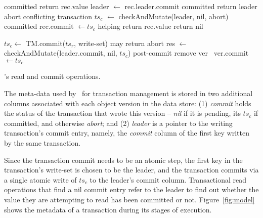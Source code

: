 \begin{algorithm}[t]
  \begin{algorithmic}
    \begin{small}
		 \Comment committed
     			   \State return rec.value \EndIf
      			\State leader $\leftarrow$ rec.leader.commit
      			  \Comment committed
     				   \State return leader \EndIf
			\Else \Comment abort conflicting transaction
				\State $ts_c$ $\leftarrow$ checkAndMutate(leader, nil, abort)
      				 \Comment  committed
     					 \State rec.commit $\leftarrow ts_c$ \Comment helping 
      				  	  return rec.value \EndIf
				\EndIf
			\EndIf
		\EndIf
      \EndFor
      \State  return nil
      \EndProcedure

\Statex

      
      	\State $ts_c \leftarrow$ TM.commit($ts_r$, write-set) \Comment may return abort
      	\State  res $\leftarrow$ {\sc checkAndMutate}(leader.commit, nil,  $ts_c$)
	\State \Comment post-commit
			 remove ver      	
			\Else\ ver.commit $\leftarrow ts_c$ 
			\EndIf
	\EndFor
\EndProcedure
      
       \end{small}
  \end{algorithmic}
  \caption{\sys's read and commit operations.} 
  \label{fig:get-pseudocode}
\end{algorithm} 

The meta-data used by \sys\ for transaction management is stored in two additional columns associated with each object version in the data store:
(1) \emph{commit} holds the status of the transaction that wrote this version -- \emph{nil} if it is pending, its  $ts_c$ if committed, and 
otherwise \emph{abort}; 
and
(2) \emph{leader} is a pointer to the writing transaction's commit entry, namely, the \emph{commit} column of the first key written by the same
transaction. 

Since the transaction commit needs to be an atomic step, the first key in the transaction's write-set is chosen to be the leader, and the transaction commits via a single atomic write of $ts_c$ to the leader's commit column. Transactional read operations that find a nil commit entry 
refer to the leader to find out whether the value they are attempting to read has been committed or not.
Figure~\ref{fig:model} shows the metadata of a transaction during its stages of execution. 

